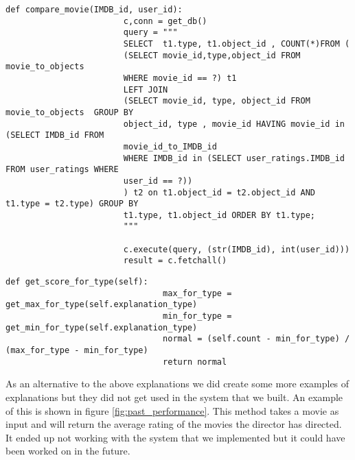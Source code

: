                 
                    \begin{minipage}{\linewidth}
                    \begin{lstlisting}[gobble=20, tabsize=4, caption=Code used to retrieve data for explanations,label=fig:CreatingExplanations]
                    def compare_movie(IMDB_id, user_id):
                        c,conn = get_db()
                        query = """
                        SELECT  t1.type, t1.object_id , COUNT(*)FROM (
                        (SELECT movie_id,type,object_id FROM movie_to_objects
                        WHERE movie_id == ?) t1
                        LEFT JOIN
                        (SELECT movie_id, type, object_id FROM movie_to_objects  GROUP BY
                        object_id, type , movie_id HAVING movie_id in (SELECT IMDB_id FROM
                        movie_id_to_IMDB_id
                        WHERE IMDB_id in (SELECT user_ratings.IMDB_id FROM user_ratings WHERE
                        user_id == ?))
                        ) t2 on t1.object_id = t2.object_id AND t1.type = t2.type) GROUP BY
                        t1.type, t1.object_id ORDER BY t1.type;
                        """

                        c.execute(query, (str(IMDB_id), int(user_id)))
                        result = c.fetchall()
                    \end{lstlisting}
                \end{minipage}

                    \begin{minipage}{\linewidth}
                        \begin{lstlisting}[gobble=24, tabsize=4,  caption=Code used to rate an explanation, label=fig:ScoringExplanations]
                            def get_score_for_type(self):
                                max_for_type = get_max_for_type(self.explanation_type)
                                min_for_type = get_min_for_type(self.explanation_type)
                                normal = (self.count - min_for_type) / (max_for_type - min_for_type)
                                return normal
                        \end{lstlisting}
                    \end{minipage}

                As an alternative to the above explanations we did create some more examples of explanations but they did not get used in the system that we built. An example of this is shown in figure \ref{fig:past_performance}. This method takes a movie as input and will return the average rating of the movies the director has directed. It ended up not working with the system that we implemented but it could have been worked on in the future.


